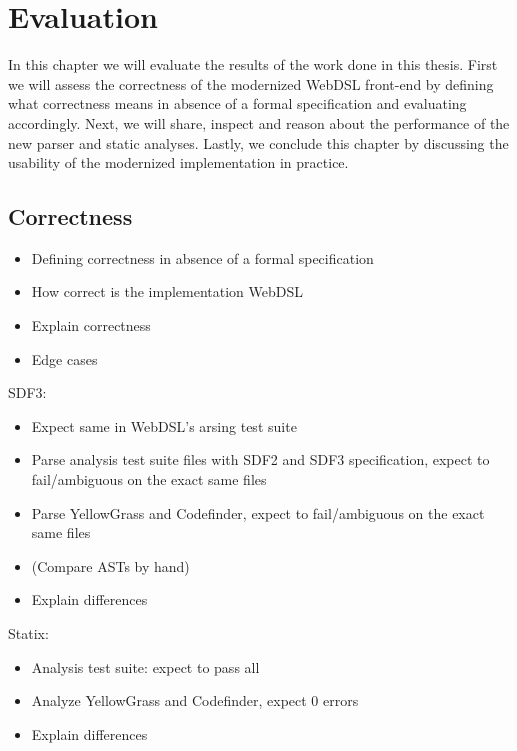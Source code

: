 
\chapter{\label{chap:evaluation}Evaluation}

In this chapter we will evaluate the results of the work done in this thesis. First we will assess the correctness of the modernized WebDSL front-end by defining what correctness means in absence of a formal specification and evaluating accordingly. Next, we will share, inspect and reason about the performance of the new parser and static analyses. Lastly, we conclude this chapter by discussing the usability of the modernized implementation in practice.

\section{\label{sec:correctness}Correctness}

  \begin{itemize}
    \item Defining correctness in absence of a formal specification
    \item How correct is the implementation WebDSL
    \item Explain correctness
    \item Edge cases
  \end{itemize}

  SDF3:

  \begin{itemize}
    \item Expect same in WebDSL's arsing test suite
    \item Parse analysis test suite files with SDF2 and SDF3 specification, expect to fail/ambiguous on the exact same files
    \item Parse YellowGrass and Codefinder, expect to fail/ambiguous on the exact same files
    \item (Compare ASTs by hand)
    \item Explain differences
  \end{itemize}

  Statix:

  \begin{itemize}
    \item Analysis test suite: expect to pass all
    \item Analyze YellowGrass and Codefinder, expect 0 errors
    \item Explain differences
  \end{itemize}

